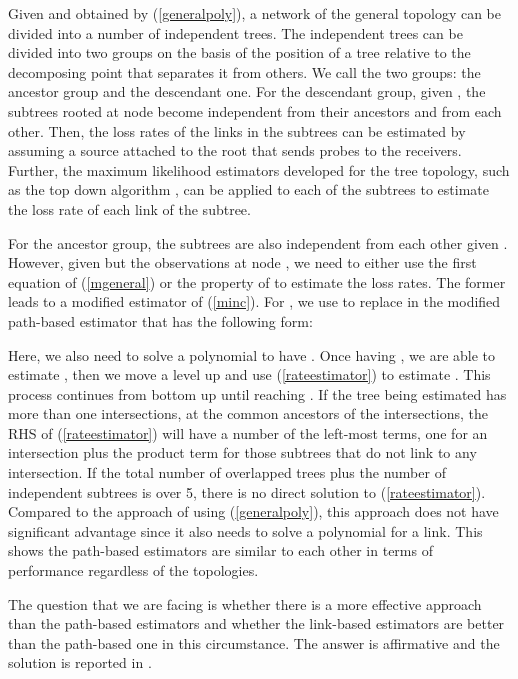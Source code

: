 \documentclass[10pt,twocolumn]{IEEEtran}
\begin{document}
 Given  and  obtained by (\ref{generalpoly}), a network of the general topology can be divided
 into a number of independent trees.
 The independent trees can be divided into two groups on the basis
 of the position of a tree relative to the decomposing point that separates it from others. We call the two groups:
 the ancestor group and the descendant one.
For the descendant group, given , the subtrees rooted at
node  become independent from their ancestors and from each other.
Then, the loss rates of the links in the subtrees can be estimated by
assuming a source attached to the root that sends  probes to
the receivers. Further, the maximum likelihood estimators developed
for the tree topology, such as the top down algorithm \cite{Zhu06},
can be applied to each of the subtrees to estimate the loss rate of
each link of the subtree.


For the  ancestor group, the subtrees are also independent from each
other given . However, given  but the observations
at node , we need to either use the first equation of
(\ref{mgeneral}) or the property of  to estimate the loss
rates. The former leads to a modified estimator of (\ref{minc}). For
, we use  to replace  in the
modified path-based estimator that has the following form:



\noindent Here, we also need to solve a polynomial to have . Once having , we are able to estimate
, then we move a level up and use
(\ref{rateestimator}) to estimate . This process
continues from bottom up until reaching . If
 the tree being estimated has more than one intersections, at
the common ancestors of the intersections, the RHS of
(\ref{rateestimator}) will have a number of the left-most terms, one
for an intersection plus the product term for those subtrees that do
not link to any intersection. If the total number of overlapped trees
plus the number of independent subtrees is over 5, there is no direct
solution to (\ref{rateestimator}). Compared to the approach of using
(\ref{generalpoly}), this approach does not have significant advantage
since it also needs to solve a polynomial for a link. This shows the
path-based estimators are similar to each other in terms of
performance regardless of the topologies.

The question that we are facing is whether there is a more effective
approach than the path-based estimators and whether the link-based
estimators are better than the path-based one in this circumstance.
The answer is affirmative and the solution is reported in
\cite{Zhu11}.
\end{document}

